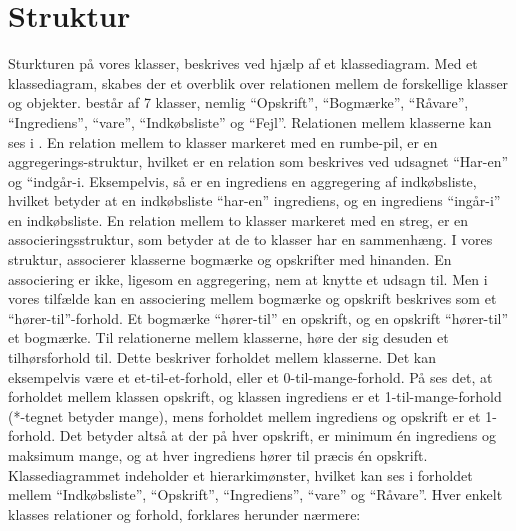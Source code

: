 \section{Struktur}
\label{sec:struktur}

Sturkturen på vores klasser, beskrives ved hjælp af et klassediagram. Med et klassediagram, skabes der et overblik over relationen mellem de forskellige klasser og objekter. \Foodl består af 7 klasser, nemlig ``Opskrift'', ``Bogmærke'', ``Råvare'', ``Ingrediens'', ``vare'', ``Indkøbsliste'' og ``Fejl''. Relationen mellem klasserne kan ses i . En relation mellem to klasser markeret med en rumbe-pil, er en aggregerings-struktur, hvilket er en relation som beskrives ved udsagnet ``Har-en'' og ``indgår-i. Eksempelvis, så er en ingrediens en aggregering af indkøbsliste, hvilket betyder at en indkøbsliste ``har-en'' ingrediens, og en ingrediens ``ingår-i'' en indkøbsliste. En relation mellem to klasser markeret med en streg, er en associeringsstruktur, som betyder at de to klasser har en sammenhæng. I vores struktur, associerer klasserne bogmærke og opskrifter med hinanden. En associering er ikke, ligesom en aggregering, nem at knytte et udsagn til. Men i vores tilfælde kan en associering mellem bogmærke og opskrift beskrives som et ``hører-til''-forhold. Et bogmærke ``hører-til'' en opskrift, og en opskrift ``hører-til'' et bogmærke. Til relationerne mellem klasserne, høre der sig desuden et tilhørsforhold til. Dette beskriver forholdet mellem klasserne. Det kan eksempelvis være et et-til-et-forhold, eller et 0-til-mange-forhold. På  ses det, at forholdet mellem klassen opskrift, og klassen ingrediens er et 1-til-mange-forhold (*-tegnet betyder mange), mens forholdet mellem ingrediens og opskrift er et 1-forhold. Det betyder altså at der på hver opskrift, er minimum én ingrediens og maksimum mange, og at hver ingrediens hører til præcis én opskrift. Klassediagrammet indeholder et hierarkimønster, hvilket kan ses i forholdet mellem ``Indkøbsliste'', ``Opskrift'', ``Ingrediens'', ``vare'' og ``Råvare''. Hver enkelt klasses relationer og forhold, forklares herunder nærmere:




